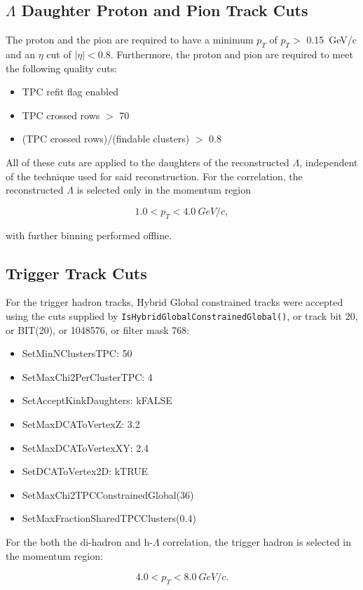 \documentclass[ALICE,manyauthors]{ALICE_analysis_notes}
\begin{document}
\subsection{$\Lambda$ Daughter Proton and Pion Track Cuts}
\label{daughtercuts}
The proton and the pion are required to have a minimum $p_{T}$ of $p_{T} >$ \SI{0.15}{GeV/c} and an $\eta$ cut of $|{\eta}| < 0.8$. Furthermore, the proton and pion are required to meet the following quality cuts:
\begin{itemize}
	\item TPC refit flag enabled
	\item TPC crossed rows $>$ 70
	\item (TPC crossed rows)/(findable clusters) $>$ 0.8
\end{itemize}
All of these cuts are applied to the daughters of the reconstructed $\Lambda$, independent of the technique used for said reconstruction. For the correlation, the reconstructed $\Lambda$ is selected only in the momentum region

$${1.0 < p_{T} < \SI{4.0}{GeV/c}},$$

with further binning performed offline.

\subsection{Trigger Track Cuts}
\label{trigcuts}
For the trigger hadron tracks, Hybrid Global constrained tracks were accepted using the cuts supplied by \texttt{IsHybridGlobalConstrainedGlobal()}, or track bit 20, or BIT(20), or 1048576, or filter mask 768:

\begin{itemize}
	\item SetMinNClustersTPC: 50
	\item SetMaxChi2PerClusterTPC: 4
	\item SetAcceptKinkDaughters: kFALSE
	\item SetMaxDCAToVertexZ: 3.2
	\item SetMaxDCAToVertexXY: 2.4
	\item SetDCAToVertex2D: kTRUE
	\item SetMaxChi2TPCConstrainedGlobal(36)
	\item SetMaxFractionSharedTPCClusters(0.4)
\end{itemize}

For the both the di-hadron and h-$\Lambda$ correlation, the trigger hadron is selected in the momentum region:

$${4.0 < p_{T} < \SI{8.0}{GeV/c}}.$$
\end{document}

